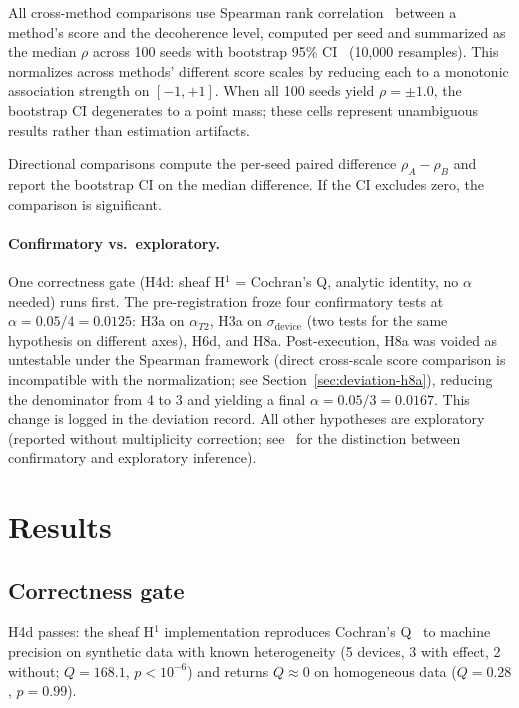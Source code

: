 \documentclass[11pt]{article}
\begin{document}
All cross-method comparisons use Spearman rank
correlation~\citep{spearman1904proof} between a method's score and the
decoherence level, computed per seed and summarized as the median
$\rho$ across 100 seeds with bootstrap 95\%
CI~\citep{efron1979bootstrap} (10,000 resamples).  This normalizes across methods' different score
scales by reducing each to a monotonic association strength on $[-1, +1]$.
When all 100 seeds yield $\rho = \pm 1.0$, the bootstrap CI degenerates
to a point mass; these cells represent unambiguous results rather than
estimation artifacts.

Directional comparisons compute the per-seed paired difference
$\rho_A - \rho_B$ and report the bootstrap CI on the median difference.
If the CI excludes zero, the comparison is significant.

\paragraph{Confirmatory vs.\ exploratory.}
One correctness gate (H4d: sheaf H$^1$ = Cochran's Q, analytic
identity, no $\alpha$ needed) runs first.  The pre-registration froze
four confirmatory tests at $\alpha = 0.05/4 = 0.0125$: H3a on
$\alpha_{T2}$, H3a on $\sigma_\text{device}$ (two tests for the same
hypothesis on different axes), H6d, and H8a.  Post-execution, H8a was
voided as untestable under the Spearman framework (direct cross-scale
score comparison is incompatible with the normalization; see
Section~\ref{sec:deviation-h8a}), reducing the denominator from 4 to 3
and yielding a final $\alpha = 0.05/3 = 0.0167$.  This change is logged
in the deviation record.  All other hypotheses are exploratory (reported without
multiplicity correction; see~\citet{benjamini1995controlling} for
the distinction between confirmatory and exploratory inference).

\section{Results}
\label{sec:results}

\subsection{Correctness gate}

H4d passes: the sheaf H$^1$ implementation reproduces Cochran's
Q~\citep{cochran1954combination} to machine precision on synthetic data with known heterogeneity (5 devices,
3 with effect, 2 without; $Q = 168.1$, $p < 10^{-6}$) and returns
$Q \approx 0$ on homogeneous data ($Q = 0.28$, $p = 0.99$).
\end{document}
